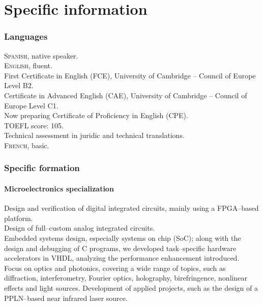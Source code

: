 \documentclass[11pt, a4paper]{article}
\newcommand{\years}[1]{\marginnote{\scriptsize #1}}
\begin{document}
\newpage
\part*{Specific information}


\section*{Languages} %
\noindent
\textsc{Spanish}, native speaker.\\

\textsc{English}, fluent.\\
First Certificate in English (FCE), University of Cambridge -- Council of Europe Level B2.\\
Certificate in Advanced English (CAE), University of Cambridge -- Council of Europe Level C1.\\
Now preparing Certificate of Proficiency in English (CPE).\\
TOEFL score: 105.\\
Technical assessment in juridic and technical translations.\\

\textsc{French}, basic.


\section*{Specific formation} %
\subsection*{Microelectronics specialization}
\noindent
\years{2008--2010}Design and verification of digital integrated circuits, mainly using a FPGA--based platform.\\
Design of full--custom analog integrated circuits.\\
Embedded systems design, especially systems on chip (SoC); along with the design and debugging of C programs, we developed task--specific hardware accelerators in VHDL, analyzing the performance enhancement introduced.\\
Focus on optics and photonics, covering a wide range of topics, such as diffraction, interferometry, Fourier optics, holography, birefringence, nonlinear effects and light sources. Development of applied projects, such as the design of a PPLN--based near infrared laser source.
\end{document}

